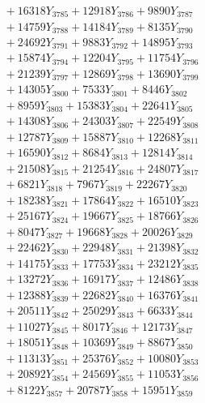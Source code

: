 \documentclass[a4paper,10pt]{article}
\begin{document}
{\begin{align}
&\;  + 16318 Y_{3785} + 12918 Y_{3786} + 9890 Y_{3787} \\[0.3ex]
&\;  + 14759 Y_{3788} + 14184 Y_{3789} + 8135 Y_{3790} \\[0.3ex]
&\;  + 24692 Y_{3791} + 9883 Y_{3792} + 14895 Y_{3793} \\[0.3ex]
&\;  + 15874 Y_{3794} + 12204 Y_{3795} + 11754 Y_{3796} \\[0.3ex]
&\;  + 21239 Y_{3797} + 12869 Y_{3798} + 13690 Y_{3799} \\[0.3ex]
&\;  + 14305 Y_{3800} + 7533 Y_{3801} + 8446 Y_{3802} \\[0.3ex]
&\;  + 8959 Y_{3803} + 15383 Y_{3804} + 22641 Y_{3805} \\[0.3ex]
&\;  + 14308 Y_{3806} + 24303 Y_{3807} + 22549 Y_{3808} \\[0.5ex]\allowbreak
&\;  + 12787 Y_{3809} + 15887 Y_{3810} + 12268 Y_{3811} \\[0.3ex]
&\;  + 16590 Y_{3812} + 8684 Y_{3813} + 12814 Y_{3814} \\[0.3ex]
&\;  + 21508 Y_{3815} + 21254 Y_{3816} + 24807 Y_{3817} \\[0.3ex]
&\;  + 6821 Y_{3818} + 7967 Y_{3819} + 22267 Y_{3820} \\[0.3ex]
&\;  + 18238 Y_{3821} + 17864 Y_{3822} + 16510 Y_{3823} \\[0.3ex]
&\;  + 25167 Y_{3824} + 19667 Y_{3825} + 18766 Y_{3826} \\[0.3ex]
&\;  + 8047 Y_{3827} + 19668 Y_{3828} + 20026 Y_{3829} \\[0.3ex]
&\;  + 22462 Y_{3830} + 22948 Y_{3831} + 21398 Y_{3832} \\[0.3ex]
&\;  + 14175 Y_{3833} + 17753 Y_{3834} + 23212 Y_{3835} \\[0.3ex]
&\;  + 13272 Y_{3836} + 16917 Y_{3837} + 12486 Y_{3838} \\[0.5ex]\allowbreak
&\;  + 12388 Y_{3839} + 22682 Y_{3840} + 16376 Y_{3841} \\[0.3ex]
&\;  + 20511 Y_{3842} + 25029 Y_{3843} + 6633 Y_{3844} \\[0.3ex]
&\;  + 11027 Y_{3845} + 8017 Y_{3846} + 12173 Y_{3847} \\[0.3ex]
&\;  + 18051 Y_{3848} + 10369 Y_{3849} + 8867 Y_{3850} \\[0.3ex]
&\;  + 11313 Y_{3851} + 25376 Y_{3852} + 10080 Y_{3853} \\[0.3ex]
&\;  + 20892 Y_{3854} + 24569 Y_{3855} + 11053 Y_{3856} \\[0.3ex]
&\;  + 8122 Y_{3857} + 20787 Y_{3858} + 15951 Y_{3859} \\[0.3ex]

\end{align}}
\end{document}
